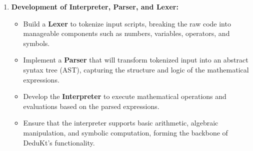 \begin{enumerate}
    \item \textbf{Development of Interpreter, Parser, and Lexer:}
    \begin{itemize}
        \item Build a \textbf{Lexer} to tokenize input scripts, breaking the raw code into manageable components such as numbers, variables, operators, and symbols.
        \item Implement a \textbf{Parser} that will transform tokenized input into an abstract syntax tree (AST), capturing the structure and logic of the mathematical expressions.
        \item Develop the \textbf{Interpreter} to execute mathematical operations and evaluations based on the parsed expressions.
        \item Ensure that the interpreter supports basic arithmetic, algebraic manipulation, and symbolic computation, forming the backbone of DeduKt's functionality.
    \end{itemize}
\end{enumerate}

